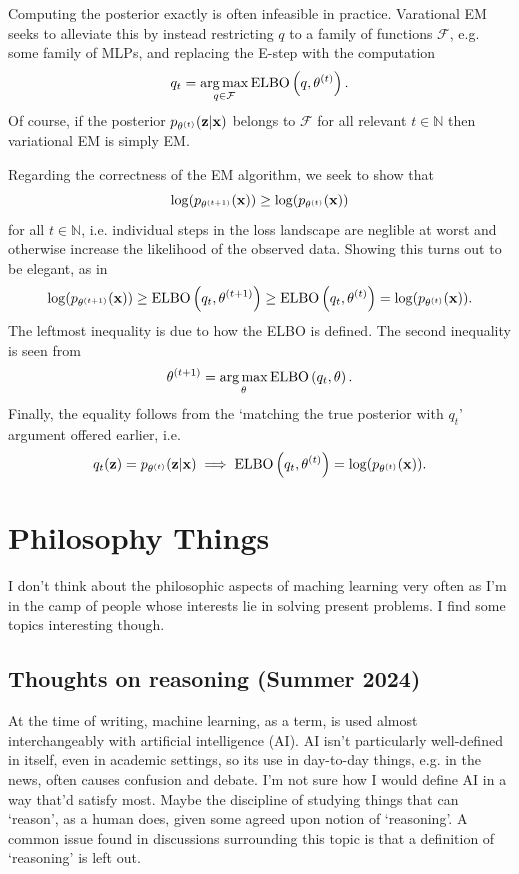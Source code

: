 \documentclass[11pt]{article}
\begin{document}
\begin{appendices}
\begin{tcolorbox}[title={\centering\textbf{Variational EM}}, colback=myLightBlue, colbacktitle=myDarkBlue, colframe=myDarkBlue, coltitle=white]
    Computing the posterior exactly is often infeasible in practice. Varational EM seeks to alleviate this by instead restricting $q$ to a family of functions $\mathcal{F}$, e.g. some family of MLPs, and replacing the E-step with the computation
    $$
    q_t
    =
    \operatorname*{arg\,max}_{q\in\mathcal{F}}\text{ELBO}\left(q,\theta^{(t)}\right).
    $$
    Of course, if the posterior $p_{\theta^{(t)}}(\mathbf{z}|\mathbf{x})$ belongs to $\mathcal{F}$ for all relevant $t\in\mathbb{N}$ then variational EM is simply EM.
\end{tcolorbox}
Regarding the correctness of the EM algorithm, we seek to show that
$$
\log(p_{\theta^{(t+1)}}(\mathbf{x}))
\geq
\log(p_{\theta^{(t)}}(\mathbf{x}))
$$
for all $t\in\mathbb{N}$, i.e. individual steps in the loss landscape are neglible at worst and otherwise increase the likelihood of the observed data. Showing this turns out to be elegant, as in
$$
\log(p_{\theta^{(t+1)}}(\mathbf{x}))
\geq
\text{ELBO}\left(q_t,\theta^{(t+1)}\right)
\geq
\text{ELBO}\left(q_t,\theta^{(t)}\right)
=
\log(p_{\theta^{(t)}}(\mathbf{x})).
$$
The leftmost inequality is due to how the ELBO is defined. The second inequality is seen from
$$
\theta^{(t+1)}
=
\operatorname*{arg\,max}_{\theta}\text{ELBO}\left(q_t,\theta\right).
$$
Finally, the equality follows from the `matching the true posterior with $q_t$' argument offered earlier, i.e.
$$
q_t(\mathbf{z})=p_{\theta^{(t)}}(\mathbf{z}|\mathbf{x})
\implies
\text{ELBO}\left(q_t,\theta^{(t)}\right)=\log(p_{\theta^{(t)}}(\mathbf{x})).
$$

\section{Philosophy Things}
I don't think about the philosophic aspects of maching learning very often as I'm in the camp of people whose interests lie in solving present problems. I find some topics interesting though.

\subsection{Thoughts on reasoning (Summer 2024)}

At the time of writing, machine learning, as a term, is used almost interchangeably with artificial intelligence (AI). AI isn't particularly well-defined in itself, even in academic settings, so its use in day-to-day things, e.g. in the news, often causes confusion and debate. I'm not sure how I would define AI in a way that'd satisfy most. Maybe the discipline of studying things that can `reason', as a human does, given some agreed upon notion of `reasoning'. A common issue found in discussions surrounding this topic is that a definition of `reasoning' is left out.


\end{appendices}
\end{document}
